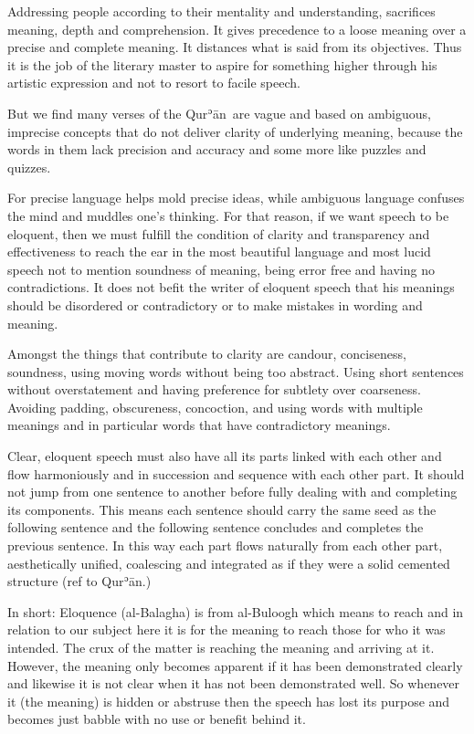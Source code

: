 \documentclass[12pt]{memoir}
\def\´{ʾ} %
\def \Quran{Qur\-\´ān} %
\def\–{-\hskip0pt}
\begin{document}
Addressing people according to their mentality and understanding,
sacrifices meaning, depth and comprehension.
It gives precedence to a loose meaning over a precise and complete meaning.
It distances what is said from its objectives.
Thus it is the job of the literary master to aspire for something higher
through his artistic expression and not to resort to facile speech.

But we find many verses of the \Quran\ are vague and based on ambiguous,
imprecise concepts that do not deliver clarity of underlying meaning,
because the words in them lack precision and accuracy
and some more like puzzles and quizzes.

For precise language helps mold precise ideas,
while ambiguous language confuses the mind and muddles one’s thinking.
For that reason, if we want speech to be eloquent,
then we must fulfill the condition of clarity and transparency
and effectiveness to reach the ear in the most beautiful language
and most lucid speech not to mention soundness of meaning,
being error free and having no contradictions.
It does not befit the writer of eloquent speech
that his meanings should be disordered or contradictory
or to make mistakes in wording and meaning.

Amongst the things that contribute to clarity are candour, conciseness,
soundness, using moving words without being too abstract.
Using short sentences without overstatement
and having preference for subtlety over coarseness.
Avoiding padding, obscureness, concoction,
and using words with multiple meanings and in particular words
that have contradictory meanings.

Clear, eloquent speech must also have all its parts linked
with each other and flow harmoniously and in succession
and sequence with each other part.
It should not jump from one sentence to another
before fully dealing with and completing its components.
This means each sentence should carry the same seed as the following sentence
and the following sentence concludes and completes the previous sentence.
In this way each part flows naturally from each other part,
aesthetically unified, coalescing and integrated
as if they were a solid cemented structure (ref to \Quran.)

In short: Eloquence (al\–Balagha) is from al\–Buloogh which means
to reach and in relation to our subject here it is for the meaning
to reach those for who it was intended.
The crux of the matter is reaching the meaning and arriving at it.
However, the meaning only becomes apparent if it has been demonstrated clearly
and likewise it is not clear when it has not been demonstrated well.
So whenever it (the meaning) is hidden or abstruse
then the speech has lost its purpose and becomes just babble
with no use or benefit behind it.
\end{document}

